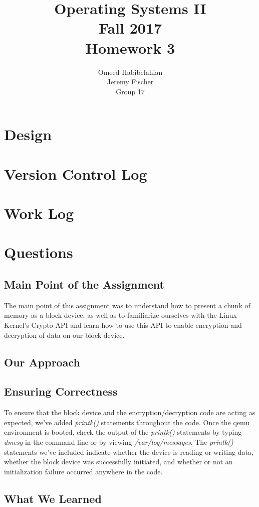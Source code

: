 \documentclass[draftclsnofoot, onecolumn, 10pt, compsoc]{IEEEtran}
\title{\textbf{Operating Systems II}\\Fall 2017\\Homework 3}
\author{Omeed Habibelahian\\Jeremy Fischer\\Group 17}
\begin{document}
	\maketitle
	\newpage
	
	\section{Design}
	\section{Version Control Log}
	\section{Work Log}
	\section{Questions}
		\subsection{Main Point of the Assignment}
			The main point of this assignment was to understand how to present a chunk of memory as a block device, as well as to familiarize ourselves with the Linux Kernel's Crypto API and learn how to use this API to enable encryption and decryption of data on our block device.
		\subsection{Our Approach}
		\subsection{Ensuring Correctness}
			To ensure that the block device and the encryption/decryption code are acting as expected, we've added \textit{printk()} statements throughout the code. Once the qemu environment is booted, check the output of the \textit{printk()} statements by typing \textit{dmesg} in the command line or by viewing \textit{/var/log/messages}. The \textit{printk()} statements we've included indicate whether the device is reading or writing data, whether the block device was successfully initiated, and whether or not an initialization failure occurred anywhere in the code.
		\subsection{What We Learned}
\end{document}
